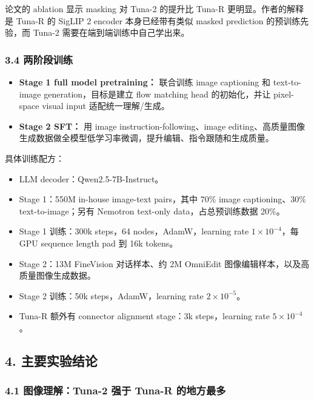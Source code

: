 论文的 ablation 显示 masking 对 Tuna-2 的提升比 Tuna-R 更明显。作者的解释是 Tuna-R 的 SigLIP 2 encoder 本身已经带有类似 masked prediction 的预训练先验，而 Tuna-2 需要在端到端训练中自己学出来。

\subsubsection{3.4 两阶段训练}

\begin{itemize}[leftmargin=1.5em]
  \item \textbf{Stage 1 full model pretraining：} 联合训练 image captioning 和 text-to-image generation，目标是建立 flow matching head 的初始化，并让 pixel-space visual input 适配统一理解/生成。
  \item \textbf{Stage 2 SFT：} 用 image instruction-following、image editing、高质量图像生成数据做全模型低学习率微调，提升编辑、指令跟随和生成质量。
\end{itemize}

具体训练配方：

\begin{itemize}[leftmargin=1.5em]
  \item LLM decoder：Qwen2.5-7B-Instruct。
  \item Stage 1：550M in-house image-text pairs，其中 70\% image captioning、30\% text-to-image；另有 Nemotron text-only data，占总预训练数据 20\%。
  \item Stage 1 训练：300k steps，64 nodes，AdamW，learning rate \(1 \times 10^{-4}\)，每 GPU sequence length pad 到 16k tokens。
  \item Stage 2：13M FineVision 对话样本、约 2M OmniEdit 图像编辑样本，以及高质量图像生成数据。
  \item Stage 2 训练：50k steps，AdamW，learning rate \(2 \times 10^{-5}\)。
  \item Tuna-R 额外有 connector alignment stage：3k steps，learning rate \(5 \times 10^{-4}\)。
\end{itemize}

\subsection{4. 主要实验结论}

\subsubsection{4.1 图像理解：Tuna-2 强于 Tuna-R 的地方最多}

